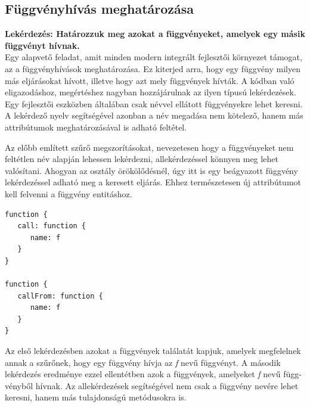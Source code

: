 \documentclass[a4paper,12pt]{report}
\begin{document}
\subsection{Függvényhívás meghatározása}
\textbf{Lekérdezés: Határozzuk meg azokat a függvényeket, amelyek egy másik függvényt hívnak.}
\\
Egy alapvető feladat, amit minden modern integrált fejlesztői környezet támogat, az a függvényhívások meghatározása. Ez kiterjed arra, hogy egy függvény milyen más eljárásokat hívott, illetve hogy azt mely függvények hívták. A kódban való eligazodáshoz, megértéshez nagyban hozzájárulnak az ilyen típusú lekérdezések. Egy fejlesztői eszközben általában csak névvel ellátott függvényekre lehet keresni. A lekérdező nyelv segítségével azonban a név megadása nem kötelező, hanem más attribútumok meghatározásával is adható feltétel.
\par  Az előbb említett szűrő megszorításokat, nevezetesen hogy a függvényeket nem feltétlen név alapján lehessen lekérdezni, allekérdezéssel könnyen meg lehet valósítani. Ahogyan az osztály örökölődésnél, úgy itt is egy beágyazott függvény lekérdezéssel adható meg a keresett eljárás. Ehhez természetesen új attribútumot kell felvenni a függvény entitáshoz.
\begin{verbatim}
function {
   call: function { 
      name: f 
   }
}

function {
   callFrom: function { 
      name: f 
   }
}
\end{verbatim}
\par Az első lekérdezésben azokat a függvények találatát kapjuk, amelyek megfelelnek annak a szűrőnek, hogy egy függvény hívja az \textit{f} nevű függvényt. A második lekérdezés eredménye ezzel ellentétben azok a függvények, amelyeket \textit{f} nevű függ-vényből hívnak. Az allekérdezések segítségével nem csak a függvény nevére lehet keresni, hanem más tulajdonságú metódusokra is.
\end{document}
